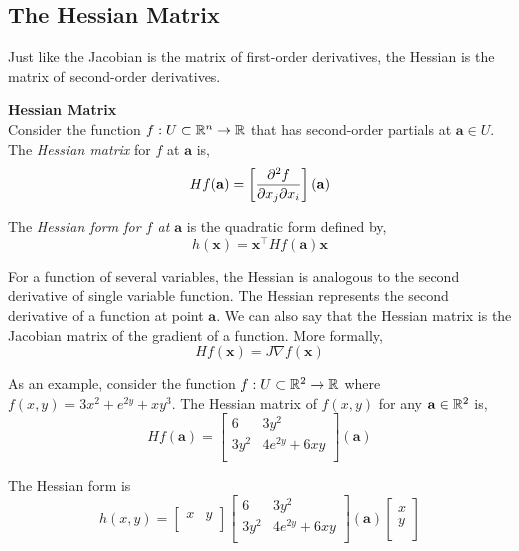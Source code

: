 \documentclass[12pt]{article}
\begin{document}
\subsection{The Hessian Matrix}

Just like the Jacobian is the matrix of first-order derivatives, the Hessian is the matrix of second-order derivatives. \\

\begin{framed}
\textbf{Hessian Matrix} \\
Consider the function $f:U\subset\mathbb{R}^n\rightarrow\mathbb{R}$ that has second-order partials at $\mathbf{a}\in U$. The \emph{Hessian matrix} for $f$ at $\mathbf{a}$ is,
\[
Hf(\mathbf{a}) = \left[ \frac{\partial ^2f}{\partial x_j\partial x_i} \right] (\mathbf{a})
\]

The \emph{Hessian form for $f$ at $\mathbf{a}$} is the quadratic form defined by,
\[
h(\mathbf{x}) = \mathbf{x}^\top Hf(\mathbf{a})\mathbf{x}
\]
\end{framed}

For a function of several variables, the Hessian is analogous to the second derivative of single variable function. The Hessian represents the second derivative of a function at point $\mathbf{a}$. We can also say that the Hessian matrix is the Jacobian matrix of the gradient of a function. More formally,
\[
Hf(\mathbf{x}) = J\nabla f(\mathbf{x})
\]

 As an example, consider the function $f:U\subset\mathbb{R}^2\rightarrow\mathbb{R}$ where $f(x,y) = 3x^2 + e^{2y} +xy^3$. The Hessian matrix of $f(x,y)$ for any $\mathbf{a}\in\mathbb{R}^2$ is,
\[
Hf(\mathbf{a}) = 
\begin{bmatrix}
6 & 3y^2 \\
3y^2 & 4e^{2y}+6xy  \\
\end{bmatrix}
(\mathbf{a})
\]

 The Hessian form is 
\[
h(x,y) = 
\begin{bmatrix}
x & y \\
\end{bmatrix}
\begin{bmatrix}
6 & 3y^2 \\
3y^2 & 4e^{2y}+6xy  \\
\end{bmatrix}
(\mathbf{a})
\begin{bmatrix}
x \\
y \\
\end{bmatrix}
\]
\end{document}
